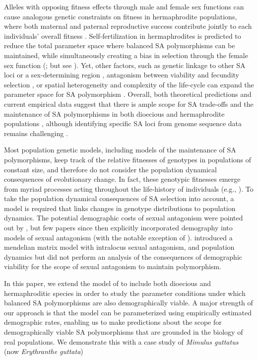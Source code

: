 \documentclass[11pt]{article}
\begin{document}
Alleles with opposing fitness effects through male and female sex functions can cause analogous genetic constraints on fitness in hermaphrodite populations, where both maternal and paternal reproductive success contribute jointly to each individuals' overall fitness \citep{LloydWebb1986, WebbLloyd1986, Abbott2011, JordanConnallon2014}. Self-fertilization in hermaphrodites is predicted to reduce the total parameter space where balanced SA polymorphisms can be maintained, while simultaneously creating a bias in selection through the female sex function (\citealt{JordanConnallon2014,Glemin2021}; but see \citealt{Tazzyman2015}). Yet, other factors, such as genetic linkage to other SA loci or a sex-determining region \citep{Otto2011, JordanCharlesworth2012, Olito2017, Olito2019}, antagonism between viability and fecundity selection \citep{Glemin2021}, or spatial heterogeneity and complexity of the life-cycle can expand the parameter space for SA polymorphism \citep{Olito-etal-2018,ConnallonSharmaOlito2019, Glemin2021}. Overall, both theoretical predictions and current empirical data suggest that there is ample scope for SA trade-offs and the maintenance of SA polymorphisms in both dioecious and hermaphrodite populations \citep{Abbott2011, WangBarrett2020}, although identifying specific SA loci from genome sequence data remains challenging \citep{RuzickaESEB2020}.

Most population genetic models, including models of the maintenance of SA polymorphisms, keep track of the relative fitnesses of genotypes in populations of constant size, and therefore do not consider the population dynamical consequences of evolutionary change. In fact, these genotypic fitnesses emerge from myriad processes acting throughout the life-history of individuals (e.g., \citealt {johnston2013life, merot2020balancing}). To take the population dynamical consequences of SA selection into account, a model is required that links changes in genotype distributions to population dynamics. The potential demographic costs of sexual antagonism were pointed out by \citep{kokko2003sexy}, but few papers since then explicitly incorporated demography into models of sexual antagonism (with the notable exception of \citealt{harts2014demography}). \citet{deVriesCaswell2019b} introduced a mendelian matrix model with intralocus sexual antagonism, and population dynamics but did not perform an analysis of the consequences of demographic viability for the scope of sexual antagonism to maintain polymorphism. 

In this paper, we extend the model of \citep{deVriesCaswell2019b} to include both dioecious and hermaphroditic species in order to study the parameter conditions under which balanced SA polymorphisms are also demographically viable. A major strength of our approach is that the model can be parameterized using empirically estimated demographic rates, enabling us to make predictions about the scope for demographically viable SA polymorphisms that are grounded in the biology of real populations. We demonstrate this with a case study of {\itshape Mimulus guttatus} (now {\itshape Erythranthe guttata})
\end{document}
